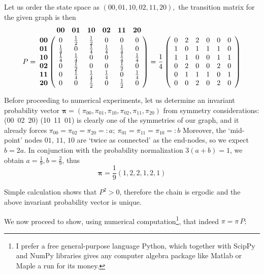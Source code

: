 \documentclass[8pt,notitlepage]{report}
\newenvironment{solution}[1][Solution]{\begin{trivlist}
    \item[\hskip \labelsep {\bfseries #1}]}{\end{trivlist}}
\begin{document}
\begin{solution}

Let us order the state space as $(00,01,10,02,11,20),$ the transition matrix for the given graph is then
$$
P = 
\bordermatrix{
  & \mathbf{00} & \mathbf{01} & \mathbf{10} &\mathbf{02} &\mathbf{11} &\mathbf{20} \cr
\mathbf{00} & 0  & \frac{1}{2}  &  \frac{1}{2} & 0  & 0  & 0 \cr
\mathbf{01} &  \frac{1}{4}  & 0  &  \frac{1}{4} & \frac{1}{4}  & \frac{1}{4}  & 0 \cr
\mathbf{10} & \frac{1}{4}  & \frac{1}{4}  &  0 & 0  & \frac{1}{4}  & \frac{1}{4} \cr
\mathbf{02} & 0  & \frac{1}{2}  &  0 & 0  & \frac{1}{2}  & 0 \cr
\mathbf{11} & 0  & \frac{1}{4}  &  \frac{1}{4} & \frac{1}{4}  & 0  & \frac{1}{4} \cr
\mathbf{20} & 0  & 0  &  \frac{1}{2} & 0  & \frac{1}{2}  & 0 \cr
}
=
\frac{1}{4}
\left(
\begin{array}{cccccc}
 0  & 2  &  2 & 0  & 0  & 0 \\
 1  & 0  &  1 & 1  & 1  & 0 \\
 1  & 1  &  0 & 0  & 1  & 1 \\
 0  & 2  &  0 & 0  & 2  & 0 \\
 0  & 1  &  1 & 1  & 0  & 1 \\
 0  & 0  &  2 & 0  & 2  & 0 \\
\end{array}
\right)
$$


Before proceeding to numerical experiments, let us determine an invariant probability vector 
$\mathbf{\pi} = (\pi_{00},\pi_{01},\pi_{10},\pi_{02},\pi_{11},\pi_{20})$
from symmetry considerations: (00\, 02\, 20) (10\, 11\, 01) is clearly one of the symmetries of our graph,
and it already forces $\pi_{00} = \pi_{02} = \pi_{20} =: a; \ \pi_{01} = \pi_{11} = \pi_{10} =: b$
Moreover, the `mid-point' nodes $01,\,11,\,10$ are `twice as connected' as the end-nodes, so we expect $ b = 2a $.
In conjunction with the probability normalization $ 3(a+b) = 1 $, we obtain $ a = \frac{1}{9}, b = \frac{2}{9} $,
thus $$\mathbf{\pi} = \frac{1}{9} ( 1,2,2,1,2,1 ) $$


Simple calculation shows that $P^2 > 0$, therefore the chain is ergodic and the above invariant probability 
vector is unique.

We now proceed to show, using numerical computation\footnote{I prefer a free general-purpose language {\rm Python}, 
which together with ScipPy and NumPy libraries gives any computer algebra package like Matlab or Maple 
a run for its money.},
that indeed $\pi = \pi\,P$:


\end{solution}
\end{document}
